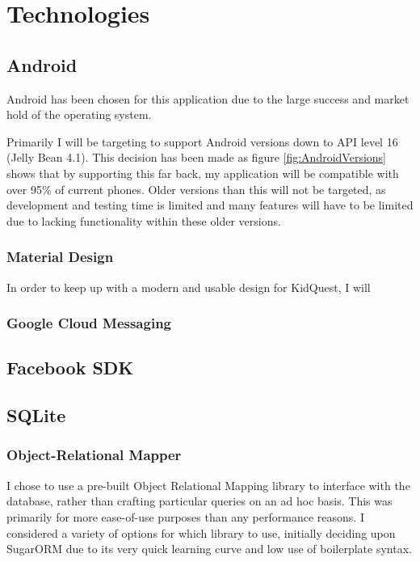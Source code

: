 \chapter{Technologies}

\section{Android}
Android has been chosen for this application due to the large success and market hold of the operating system.

Primarily I will be targeting to support Android versions down to API level 16 (Jelly Bean 4.1).
This decision has been made as figure \ref{fig:AndroidVersions} shows that by supporting this far back, my application will be compatible with over 95\% of current phones. 
Older versions than this will not be targeted, as development and testing time is limited and many features will have to be limited due to lacking functionality within these older versions.

\subsection{Material Design}
In order to keep up with a modern and usable design for KidQuest, I will 

\subsection{Google Cloud Messaging}

\section{Facebook SDK}

\section{SQLite}

\subsection{Object-Relational Mapper}
I chose to use a pre-built Object Relational Mapping library to interface with the database, rather than crafting particular queries on an ad hoc basis.
This was primarily for more ease-of-use purposes than any performance reasons. 
I considered a variety of options for which library to use, initially deciding upon SugarORM due to its very quick learning curve and low use of boilerplate syntax. 

